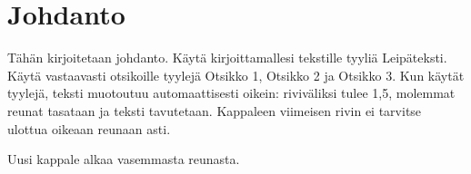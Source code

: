 \chapter{Johdanto}

Tähän kirjoitetaan johdanto. Käytä kirjoittamallesi tekstille tyyliä Leipäteksti. Käytä vastaavasti otsikoille tyylejä Otsikko 1, Otsikko 2 ja Otsikko 3. Kun käytät tyylejä, teksti muotoutuu automaattisesti oikein: riviväliksi tulee 1,5, molemmat reunat tasataan ja teksti tavutetaan. Kappaleen viimeisen rivin ei tarvitse ulottua oikeaan reunaan asti.

Uusi kappale alkaa vasemmasta reunasta.